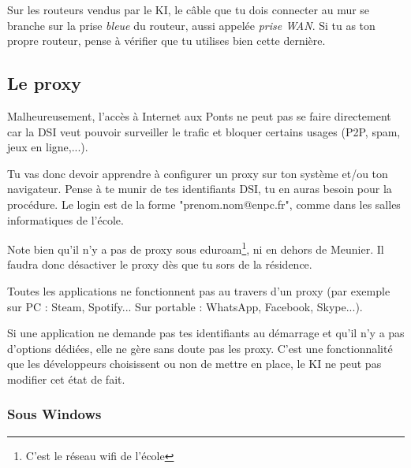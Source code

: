 \documentclass{../templates/enpc-ki/ki019}
\begin{document}
    Sur les routeurs vendus par le KI, le câble que tu dois connecter au mur se branche sur la prise \emph{bleue} du routeur, aussi appelée \emph{prise WAN}. Si tu as ton propre routeur, pense à vérifier que tu utilises bien cette dernière.



  \newpage
    \subsection{Le proxy}
    {Malheureusement, l’accès à Internet aux Ponts ne peut pas se faire directement car la DSI veut pouvoir surveiller le trafic et bloquer certains usages (P2P, spam, jeux en ligne,...).}

    Tu vas donc devoir apprendre à configurer un proxy sur ton système et/ou ton navigateur. Pense à te munir de tes identifiants DSI, tu en auras besoin pour la procédure. Le login est de la forme "prenom.nom@enpc.fr", comme dans les salles informatiques de l'école.

    Note bien qu'il n'y a pas de proxy sous eduroam\footnote{C'est le réseau wifi de l'école}, ni en dehors de Meunier. Il faudra donc désactiver le proxy dès que tu sors de la résidence.

    \begin{kiframe}
      Toutes les applications ne fonctionnent pas au travers d'un proxy (par exemple sur PC : Steam, Spotify... Sur portable : WhatsApp, Facebook, Skype...).

      Si une application ne demande pas tes identifiants au démarrage et qu'il n'y a pas d'options dédiées, elle ne gère sans doute pas les proxy. C'est une fonctionnalité que les développeurs choisissent ou non de mettre en place, le KI ne peut pas modifier cet état de fait.
    \end{kiframe}

\newpage
      \subsubsection{Sous Windows}
\end{document}
